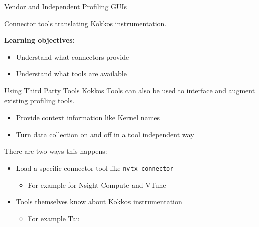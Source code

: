 \begin{frame}[fragile]

  {\Huge Vendor and Independent Profiling GUIs}

  \vspace{10pt}

  {\large Connector tools translating Kokkos instrumentation.}

  \vspace{20pt}

  \textbf{Learning objectives:}
  \begin{itemize}
    \item {Understand what connectors provide}
    \item {Understand what tools are available}
  \end{itemize}

  \vspace{-20pt}

\end{frame}


\begin{frame}[fragile]{Using Third Party Tools}
Kokkos Tools can also be used to interface and augment existing profiling tools.

\begin{itemize}
  \item Provide context information like Kernel names
  \item Turn data collection on and off in a tool independent way
\end{itemize}

\vspace{10pt}
There are two ways this happens:
\begin{itemize}
  \item Load a specific connector tool like \texttt{nvtx-connector}
  \begin{itemize}
     \item For example for Nsight Compute and VTune
  \end{itemize}
  \item Tools themselves know about Kokkos instrumentation
  \begin{itemize}
     \item For example Tau
  \end{itemize}
\end{itemize}
\end{frame}

